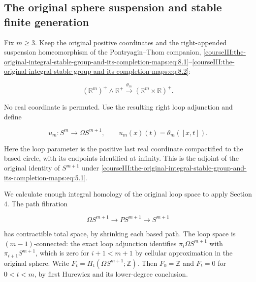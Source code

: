 \subsection{The original sphere suspension and stable finite generation}
\label{courseIII:the-original-integral-stable-group-and-its-completion-maps:integral-original-suspension}

\label{courseIII:the-original-integral-stable-group-and-its-completion-maps:section-5}\label{courseIII:integral-stable:5}

Fix \(m\geq3\). Keep the original positive coordinates and the right-appended suspension homeomorphism of the Pontryagin--Thom companion, \eqref{courseIII:the-original-integral-stable-group-and-its-completion-maps:eq:8.1}--\eqref{courseIII:the-original-integral-stable-group-and-its-completion-maps:eq:8.2}:

\begin{equation}
(\mathbb R^m)^+\wedge\mathbb R^+
   \xrightarrow{\theta_m}(\mathbb R^m\times\mathbb R)^+.
 \label{courseIII:the-original-integral-stable-group-and-its-completion-maps:eq:5.1}
\end{equation}

No real coordinate is permuted. Use the resulting right loop adjunction and define

\begin{equation}
u_m:S^m\longrightarrow\Omega S^{m+1},
 \qquad u_m(x)(t)=\theta_m([x,t]).
 \label{courseIII:the-original-integral-stable-group-and-its-completion-maps:eq:5.2}
\end{equation}

Here the loop parameter is the positive last real coordinate compactified to the based circle, with its endpoints identified at infinity. This is the adjoint of the original identity of \(S^{m+1}\) under \eqref{courseIII:the-original-integral-stable-group-and-its-completion-maps:eq:5.1}.

We calculate enough integral homology of the original loop space to apply Section 4. The path fibration

\begin{equation}
\Omega S^{m+1}\longrightarrow P S^{m+1}\longrightarrow S^{m+1}
 \label{courseIII:the-original-integral-stable-group-and-its-completion-maps:eq:5.3}
\end{equation}

has contractible total space, by shrinking each based path. The loop space is \((m-1)\)-connected: the exact loop adjunction identifies \(\pi_i\Omega S^{m+1}\) with \(\pi_{i+1}S^{m+1}\), which is zero for \(i+1<m+1\) by cellular approximation in the original sphere. Write \(F_t=H_t(\Omega S^{m+1};\mathbb Z)\). Then \(F_0=\mathbb Z\) and \(F_t=0\) for \(0<t<m\), by first Hurewicz and its lower-degree conclusion.


